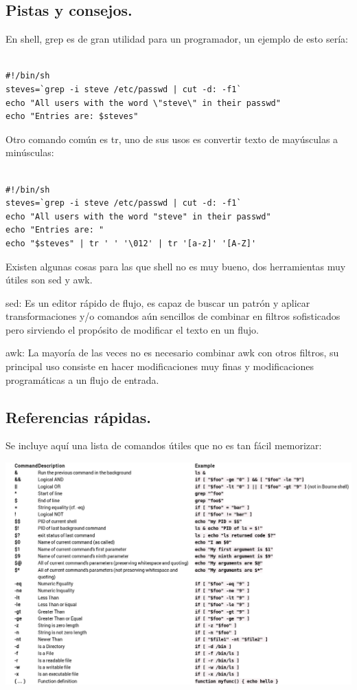 \documentclass{article} %
\begin{document}
\subsection{Pistas y consejos.}

En shell, grep es de gran utilidad para un programador, un ejemplo de esto sería:

\begin{verbatim} 

#!/bin/sh
steves=`grep -i steve /etc/passwd | cut -d: -f1`
echo "All users with the word \"steve\" in their passwd"
echo "Entries are: $steves"

\end{verbatim}

Otro comando común es tr, uno de sus usos es convertir texto de mayúsculas a minúsculas:

\begin{verbatim} 

#!/bin/sh
steves=`grep -i steve /etc/passwd | cut -d: -f1`
echo "All users with the word "steve" in their passwd"
echo "Entries are: "
echo "$steves" | tr ' ' '\012' | tr '[a-z]' '[A-Z]'

\end{verbatim}

Existen algunas cosas para las que shell no es muy bueno, dos herramientas muy útiles son sed y awk.

sed: Es un editor rápido de flujo, es capaz de buscar un patrón y aplicar transformaciones y/o comandos aún sencillos de combinar en filtros sofisticados pero sirviendo el propósito de modificar el texto en un flujo.

awk: La mayoría de las veces no es necesario combinar awk con otros filtros, su principal uso consiste en hacer modificaciones muy finas y modificaciones programáticas a un flujo de entrada.

\subsection{Referencias rápidas.}

Se incluye aquí una lista de comandos útiles que no es tan fácil memorizar:

\begin{center}
 	\includegraphics[width=15cm]{sheet.png}
 \end{center}
\end{document}
